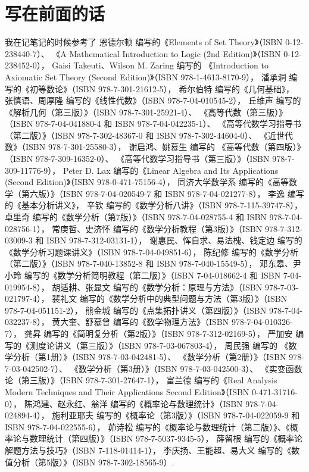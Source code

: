 \chapter*{写在前面的话}
我在记笔记的时候参考了
恩德尔顿 编写的《Elements of Set Theory》（ISBN 0-12-238440-7）、
《A Mathematical Introduction to Logic (2nd Edition)》（ISBN 0-12-238452-0），
Gaisi Takeuti、Wilson M. Zaring 编写的
《Introduction to Axiomatic Set Theory (Second Edition)》（ISBN 978-1-4613-8170-9），
潘承洞 编写的《初等数论》（ISBN 978-7-301-21612-5），
希尔伯特 编写的《几何基础》，
张慎语、周厚隆 编写的《线性代数》（ISBN 978-7-04-010545-2），
丘维声 编写的
《解析几何（第三版）》（ISBN 978-7-301-25921-4）、
《高等代数（第三版）》（ISBN 978-7-04-041880-4 和 ISBN 978-7-04-042235-1）、
《高等代数学习指导书（第二版）》（ISBN 978-7-302-48367-0 和 ISBN 978-7-302-44604-0）、
《近世代数》（ISBN 978-7-301-25580-3），
谢启鸿、姚慕生 编写的
《高等代数（第四版）》（ISBN 978-7-309-16352-0）、
《高等代数学习指导书（第三版）》（ISBN 978-7-309-11776-9），
Peter D. Lax 编写的《Linear Algebra and Its Applications (Second Edition)》（ISBN 978-0-471-75156-4），
同济大学数学系 编写的《高等数学（第六版）》（ISBN 978-7-04-020549-7 和 ISBN 978-7-04-021277-8），
李逸 编写的《基本分析讲义》，
辛钦 编写的《数学分析八讲》（ISBN 978-7-115-39747-8），
卓里奇 编写的《数学分析（第7版）》（ISBN 978-7-04-028755-4 和 ISBN 978-7-04-028756-1），
常庚哲、史济怀 编写的《数学分析教程（第3版）》（ISBN 978-7-312-03009-3 和 ISBN 978-7-312-03131-1），
谢惠民、恽自求、易法槐、钱定边 编写的《数学分析习题课讲义》（ISBN 978-7-04-049851-6），
陈纪修 编写的《数学分析（第二版）》（ISBN 978-7-040-13852-8 和 ISBN 978-7-040-15549-5），
邓东皋、尹小玲 编写的《数学分析简明教程（第二版）》（ISBN 7-04-018662-4 和 ISBN 7-04-019954-8），
胡适耕、张显文 编写的《数学分析：原理与方法》（ISBN 978-7-03-021797-4），
裴礼文 编写的《数学分析中的典型问题与方法（第3版）》（ISBN 978-7-04-051151-2），
熊金城 编写的《点集拓扑讲义（第四版）》（ISBN 978-7-04-032237-8），
黄大奎、舒慕曾 编写的《数学物理方法》（ISBN 978-7-04-010326-7），
龚昇 编写的《简明复分析（第2版）》（ISBN 978-7-312-02169-5），
严加安 编写的《测度论讲义（第三版）》（ISBN 978-7-03-067803-4），
周民强 编写的
《数学分析（第1册）》（ISBN 978-7-03-042481-5）、
《数学分析（第2册）》（ISBN 978-7-03-042502-7）、
《数学分析（第3册）》（ISBN 978-7-03-042500-3）、
《实变函数论（第三版）》（ISBN 978-7-301-27647-1），
富兰德 编写的《Real Analysis Modern Techniques and Their Applications Second Edition》（ISBN 0-471-31716-0），
陈鸿建、赵永红、翁洋 编写的《概率论与数理统计》（ISBN 978-7-04-024894-4），
施利亚耶夫 编写的《概率论（第3版）》（ISBN 978-7-04-022059-9 和 ISBN 978-7-04-022555-6），
茆诗松 编写的《概率论与数理统计（第二版）》、《概率论与数理统计（第四版）》（ISBN 978-7-5037-9345-5），
薛留根 编写的《概率论解题方法与技巧》（ISBN 7-118-01414-1），
李庆扬、王能超、易大义 编写的《数值分析（第5版）》（ISBN 978-7-302-18565-9）.

